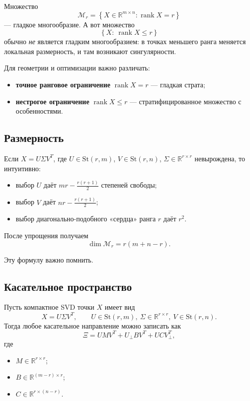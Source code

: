 \documentclass[12pt,a4paper]{article}
\theoremstyle{rudef}
\theoremstyle{ruplain}
\newcommand{\R}{\mathbb{R}}
\newcommand{\rank}{\operatorname{rank}}
\newcommand{\St}{\mathrm{St}}
\newcommand{\set}[1]{\left\{#1\right\}}
\begin{document}
Множество
\[
\mathcal M_r=\set{X\in \R^{m\times n}: \rank X=r}
\]
--- гладкое многообразие. А вот множество
\[
\set{X:\ \rank X\le r}
\]
обычно \emph{не} является гладким многообразием: в точках меньшего ранга меняется локальная размерность, и там возникают сингулярности.

\begin{warningbox}
Для геометрии и оптимизации важно различать:
\begin{itemize}
  \item \textbf{точное ранговое ограничение} $\rank X=r$ --- гладкая страта;
  \item \textbf{нестрогое ограничение} $\rank X\le r$ --- стратифицированное множество с особенностями.
\end{itemize}
\end{warningbox}

\subsection{Размерность}

Если $X=U\Sigma V^T$, где $U\in \St(r,m)$, $V\in \St(r,n)$, $\Sigma\in \R^{r\times r}$ невырождена, то интуитивно:
\begin{itemize}
  \item выбор $U$ даёт $mr-\frac{r(r+1)}{2}$ степеней свободы;
  \item выбор $V$ даёт $nr-\frac{r(r+1)}{2}$;
  \item выбор диагонально-подобного «сердца» ранга $r$ даёт $r^2$.
\end{itemize}
После упрощения получаем
\[
\dim \mathcal M_r = r(m+n-r).
\]

Эту формулу важно помнить.

\subsection{Касательное пространство}

Пусть компактное SVD точки $X$ имеет вид
\[
X=U\Sigma V^T,
\qquad U\in \St(r,m),\ \Sigma\in \R^{r\times r},\ V\in \St(r,n).
\]
Тогда любое касательное направление можно записать как
\[
\Xi = U M V^T + U_\perp B V^T + U C V_\perp^T,
\]
где
\begin{itemize}
  \item $M\in \R^{r\times r}$;
  \item $B\in \R^{(m-r)\times r}$;
  \item $C\in \R^{r\times (n-r)}$.
\end{itemize}
\end{document}
